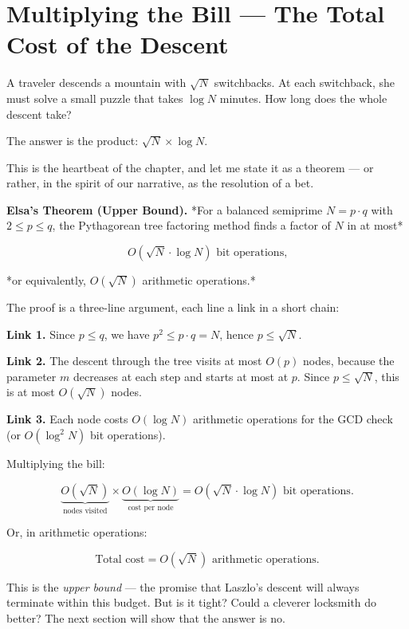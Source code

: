 \documentclass[11pt,openright,twoside]{book}
\theoremstyle{definition}
\begin{document}
\bigskip


\section{Multiplying the Bill — The Total Cost of the Descent}

A traveler descends a mountain with $\sqrt{N}$ switchbacks. At each switchback, she must solve a small puzzle that takes $\log N$ minutes. How long does the whole descent take?

The answer is the product: $\sqrt{N} \times \log N$.

This is the heartbeat of the chapter, and let me state it as a theorem --- or rather, in the spirit of our narrative, as the resolution of a bet.

\textbf{Elsa's Theorem (Upper Bound).} *For a balanced semiprime $N = p \cdot q$ with $2 \le p \le q$, the Pythagorean tree factoring method finds a factor of $N$ in at most*

\[O\!\left(\sqrt{N} \cdot \log N\right) \text{ bit operations,}\]

*or equivalently, $O(\sqrt{N})$ arithmetic operations.*

The proof is a three-line argument, each line a link in a short chain:

\textbf{Link 1.} Since $p \le q$, we have $p^2 \le p \cdot q = N$, hence $p \le \sqrt{N}$.

\textbf{Link 2.} The descent through the tree visits at most $O(p)$ nodes, because the parameter $m$ decreases at each step and starts at most at $p$. Since $p \le \sqrt{N}$, this is at most $O(\sqrt{N})$ nodes.

\textbf{Link 3.} Each node costs $O(\log N)$ arithmetic operations for the GCD check (or $O(\log^2 N)$ bit operations).

Multiplying the bill:

\[\underbrace{O(\sqrt{N})}_{\text{nodes visited}} \times \underbrace{O(\log N)}_{\text{cost per node}} = O(\sqrt{N} \cdot \log N) \text{ bit operations.}\]

Or, in arithmetic operations:

\[\boxed{\text{Total cost} = O\!\left(\sqrt{N}\right) \text{ arithmetic operations.}}\]

This is the \textit{upper bound} --- the promise that Laszlo's descent will always terminate within this budget. But is it tight? Could a cleverer locksmith do better? The next section will show that the answer is no.
\end{document}
